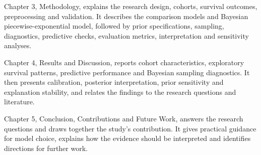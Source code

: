 Chapter 3, Methodology, explains the research design, cohorts, survival outcomes, preprocessing and validation. It describes the comparison models and Bayesian piecewise-exponential model, followed by prior specifications, sampling, diagnostics, predictive checks, evaluation metrics, interpretation and sensitivity analyses.

Chapter 4, Results and Discussion, reports cohort characteristics, exploratory survival patterns, predictive performance and Bayesian sampling diagnostics. It then presents calibration, posterior interpretation, prior sensitivity and explanation stability, and relates the findings to the research questions and literature.

Chapter 5, Conclusion, Contributions and Future Work, answers the research questions and draws together the study's contribution. It gives practical guidance for model choice, explains how the evidence should be interpreted and identifies directions for further work.
